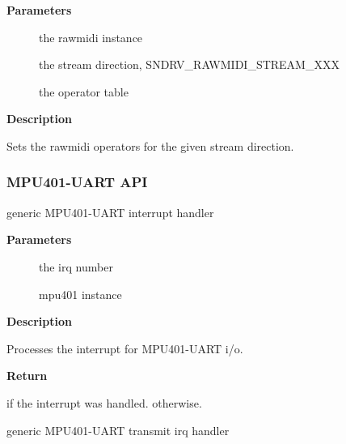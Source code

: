 \documentclass[a4paper,8pt,english]{sphinxmanual}
\begin{document}
\textbf{Parameters}
\begin{description}
\item[{}] \leavevmode
the rawmidi instance

\item[{}] \leavevmode
the stream direction, SNDRV\_RAWMIDI\_STREAM\_XXX

\item[{}] \leavevmode
the operator table

\end{description}

\textbf{Description}

Sets the rawmidi operators for the given stream direction.


\subsubsection{MPU401-UART API}
\label{sound/kernel-api/alsa-driver-api:mpu401-uart-api}

\begin{fulllineitems}
\label{sound/kernel-api/alsa-driver-api:c.snd_mpu401_uart_interrupt}
generic MPU401-UART interrupt handler

\end{fulllineitems}


\textbf{Parameters}
\begin{description}
\item[{}] \leavevmode
the irq number

\item[{}] \leavevmode
mpu401 instance

\end{description}

\textbf{Description}

Processes the interrupt for MPU401-UART i/o.

\textbf{Return}

 if the interrupt was handled.  otherwise.

\begin{fulllineitems}
\label{sound/kernel-api/alsa-driver-api:c.snd_mpu401_uart_interrupt_tx}
generic MPU401-UART transmit irq handler

\end{fulllineitems}
\end{document}
